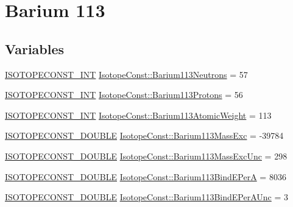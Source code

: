 \hypertarget{group___isotope_const-_barium-_ba113}{}\section{Barium 113}
\label{group___isotope_const-_barium-_ba113}
\subsection*{Variables}
\begin{DoxyCompactItemize}
\item 
\mbox{\hyperlink{group___isotope_const-_macros_ga5f18360b3e99483a35c32d789e62621c}{I\+S\+O\+T\+O\+P\+E\+C\+O\+N\+S\+T\+\_\+\+I\+NT}} \mbox{\hyperlink{group___isotope_const-_barium-_ba113_gae8ed1f0a9f3c737acd9dc30771db5d12}{Isotope\+Const\+::\+Barium113\+Neutrons}} = 57
\item 
\mbox{\hyperlink{group___isotope_const-_macros_ga5f18360b3e99483a35c32d789e62621c}{I\+S\+O\+T\+O\+P\+E\+C\+O\+N\+S\+T\+\_\+\+I\+NT}} \mbox{\hyperlink{group___isotope_const-_barium-_ba113_gacc481e2f9abe76df235ee0e1ae7c4df7}{Isotope\+Const\+::\+Barium113\+Protons}} = 56
\item 
\mbox{\hyperlink{group___isotope_const-_macros_ga5f18360b3e99483a35c32d789e62621c}{I\+S\+O\+T\+O\+P\+E\+C\+O\+N\+S\+T\+\_\+\+I\+NT}} \mbox{\hyperlink{group___isotope_const-_barium-_ba113_ga8c2eb20042c14c5c7d35da9ce5b54912}{Isotope\+Const\+::\+Barium113\+Atomic\+Weight}} = 113
\item 
\mbox{\hyperlink{group___isotope_const-_macros_ga8f45a7272ce02c0b4c65c44636ed719a}{I\+S\+O\+T\+O\+P\+E\+C\+O\+N\+S\+T\+\_\+\+D\+O\+U\+B\+LE}} \mbox{\hyperlink{group___isotope_const-_barium-_ba113_ga27907be803a7676a9b5e2c75ceb97059}{Isotope\+Const\+::\+Barium113\+Mass\+Exc}} = -\/39784
\item 
\mbox{\hyperlink{group___isotope_const-_macros_ga8f45a7272ce02c0b4c65c44636ed719a}{I\+S\+O\+T\+O\+P\+E\+C\+O\+N\+S\+T\+\_\+\+D\+O\+U\+B\+LE}} \mbox{\hyperlink{group___isotope_const-_barium-_ba113_ga51fbc08fed3e07ef6fd7755480e8739f}{Isotope\+Const\+::\+Barium113\+Mass\+Exc\+Unc}} = 298
\item 
\mbox{\hyperlink{group___isotope_const-_macros_ga8f45a7272ce02c0b4c65c44636ed719a}{I\+S\+O\+T\+O\+P\+E\+C\+O\+N\+S\+T\+\_\+\+D\+O\+U\+B\+LE}} \mbox{\hyperlink{group___isotope_const-_barium-_ba113_ga4aaedc4a54c2b882eeebd2156dca6779}{Isotope\+Const\+::\+Barium113\+Bind\+E\+PerA}} = 8036
\item 
\mbox{\hyperlink{group___isotope_const-_macros_ga8f45a7272ce02c0b4c65c44636ed719a}{I\+S\+O\+T\+O\+P\+E\+C\+O\+N\+S\+T\+\_\+\+D\+O\+U\+B\+LE}} \mbox{\hyperlink{group___isotope_const-_barium-_ba113_gae0c81149d13aa335aca07009e77434dc}{Isotope\+Const\+::\+Barium113\+Bind\+E\+Per\+A\+Unc}} = 3

\end{DoxyCompactItemize}
